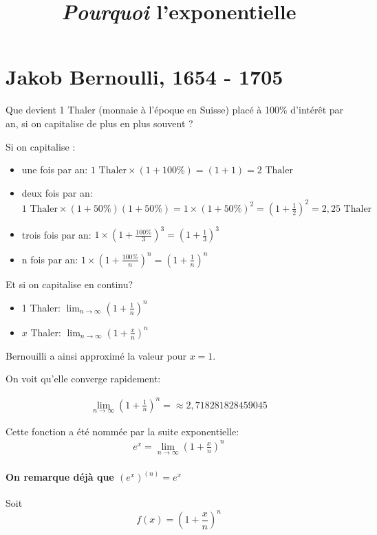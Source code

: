 \documentclass[12pt]{article}
\title{\textit{Pourquoi} l'exponentielle}
\begin{document}
\maketitle 

\section{Jakob Bernoulli, 1654 - 1705}
Que devient 1 Thaler (monnaie à l'époque en Suisse) placé à 100\% d’intérêt par an, si on capitalise de plus en plus souvent ?

Si on capitalise :

\begin{itemize}
    \item une fois par an: $1 \text{ Thaler}\times (1 + 100\%) = (1 + 1) = 2  \text{ Thaler}$
    \item deux fois par an: $1 \text{ Thaler} \times (1 + 50\%)(1 + 50\%) = 1 \times (1 + 50\%)^2 = (1 + \frac{1}{2})^2 = 2,25\text{ Thaler} $
    \item trois fois par an: $1 \times (1 + \frac{100\%}{3})^3 = (1 + \frac{1}{3})^3$
    \item n fois par an: $1 \times (1 + \frac{100\%}{n})^n = (1 + \frac{1}{n})^n$
\end{itemize}

Et si on capitalise en continu?
\begin{itemize}
    \item 1 Thaler: $\lim_{n\to\infty}(1+\frac{1}{n})^n$
    \item $x$ Thaler: $\lim_{n\to\infty}(1+\frac{x}{n})^n$
\end{itemize}

Bernouilli a ainsi approximé la valeur pour $x=1$. 

On voit qu'elle converge rapidement:


\begin{gather*}
    \lim_{n\to\infty}(1+\frac{1}{n})^n = \approx 2,718281828459045
\end{gather*}

Cette fonction a été nommée par la suite exponentielle:
\begin{gather*}
    e^x=\lim_{n\to\infty}(1+\frac{x}{n})^n
\end{gather*}

\paragraph{On remarque déjà que $(e^x)^{(n)}=e^x$}
Soit
\[
f(x)=\left(1+\frac{x}{n}\right)^n
\]
\end{document}
